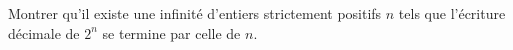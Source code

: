 Montrer qu'il existe une infinité d'entiers strictement positifs $n$ tels que l'écriture décimale de $2^n$ se termine par celle de $n$.
